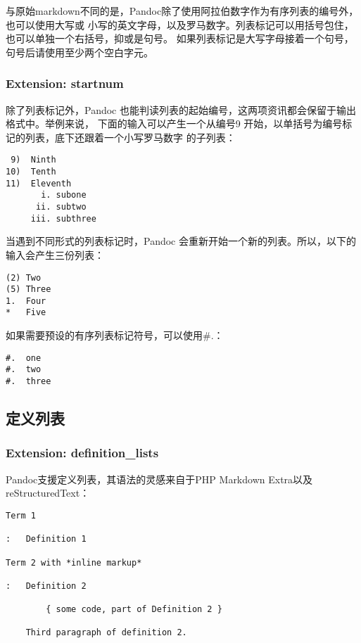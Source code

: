 \documentclass[cn]{elegantbook}
\begin{document}
与原始markdown不同的是，Pandoc除了使用阿拉伯数字作为有序列表的编号外，也可以使用大写或
小写的英文字母，以及罗马数字。列表标记可以用括号包住，也可以单独一个右括号，抑或是句号。
如果列表标记是大写字母接着一个句号，句号后请使用至少两个空白字元。

\hypertarget{extension-startnum}{%
\subsubsection{Extension: startnum}\label{extension-startnum}}

除了列表标记外，Pandoc
也能判读列表的起始编号，这两项资讯都会保留于输出格式中。举例来说，
下面的输入可以产生一个从编号9
开始，以单括号为编号标记的列表，底下还跟着一个小写罗马数字 的子列表：

\begin{lstlisting}
 9)  Ninth
10)  Tenth
11)  Eleventh
       i. subone
      ii. subtwo
     iii. subthree
\end{lstlisting}

当遇到不同形式的列表标记时，Pandoc
会重新开始一个新的列表。所以，以下的输入会产生三份列表：

\begin{lstlisting}
(2) Two
(5) Three
1.  Four
*   Five
\end{lstlisting}

如果需要预设的有序列表标记符号，可以使用\#.：

\begin{lstlisting}
#.  one
#.  two
#.  three
\end{lstlisting}

\hypertarget{ux5b9aux4e49ux5217ux8868}{%
\subsection{定义列表}\label{ux5b9aux4e49ux5217ux8868}}

\hypertarget{extension-definition_lists}{%
\subsubsection{Extension:
definition\_lists}\label{extension-definition_lists}}

Pandoc支援定义列表，其语法的灵感来自于PHP Markdown
Extra以及reStructuredText：

\begin{lstlisting}
Term 1

:   Definition 1

Term 2 with *inline markup*

:   Definition 2

        { some code, part of Definition 2 }

    Third paragraph of definition 2.
\end{lstlisting}
\end{document}
